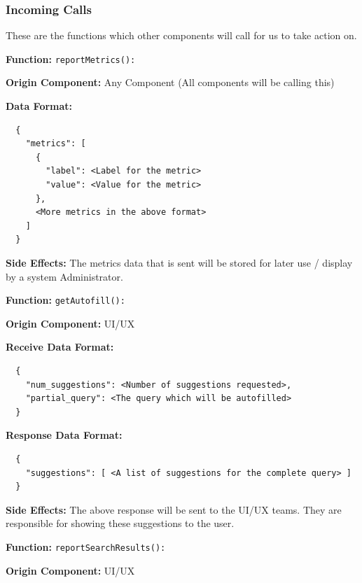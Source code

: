 \subsubsection*{Incoming Calls}
These are the functions which other components will call for us to take action on.

\medskip

\textbf{Function:} \verb|reportMetrics():|

\smallskip

\textbf{Origin Component:} Any Component (All components will be calling this)

\smallskip

\textbf{Data Format:} \begin{verbatim}
  {
    "metrics": [
      {
        "label": <Label for the metric>
        "value": <Value for the metric>
      },
      <More metrics in the above format>
    ]
  }
\end{verbatim}

\smallskip

\textbf{Side Effects:} The metrics data that is sent will be stored for later use / display by a system Administrator.

\bigskip

\textbf{Function:} \verb|getAutofill():|

\smallskip

\textbf{Origin Component:} UI/UX

\smallskip

\textbf{Receive Data Format:} \begin{verbatim}
  {
    "num_suggestions": <Number of suggestions requested>,
    "partial_query": <The query which will be autofilled>
  }
\end{verbatim}

\textbf{Response Data Format:} \begin{verbatim}
  {
    "suggestions": [ <A list of suggestions for the complete query> ]
  }
\end{verbatim}

\smallskip

\textbf{Side Effects:} The above response will be sent to the UI/UX teams. They are responsible for showing these suggestions to the user.

\bigskip

\textbf{Function:} \verb|reportSearchResults():|

\smallskip

\textbf{Origin Component:} UI/UX

